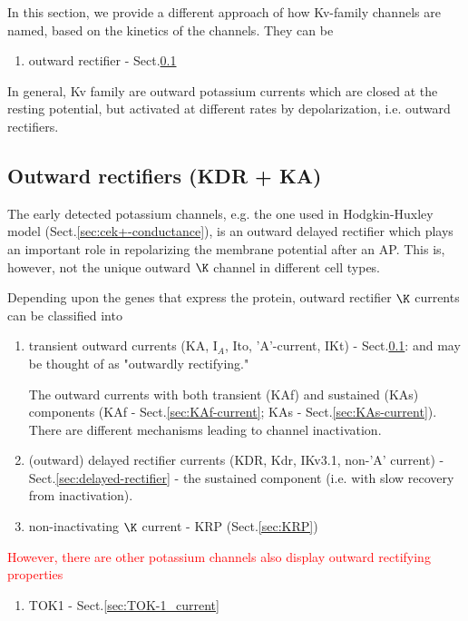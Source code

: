 In this section, we provide a different approach of how Kv-family channels are
named, based on the kinetics of the channels. 
They can be
\begin{enumerate}
  \item outward rectifier - Sect.\ref{sec:K_outward-rectifier}
\end{enumerate}
In general, Kv family are outward
potassium currents which are closed at the resting potential, but activated at
different rates by depolarization, i.e. outward rectifiers.

\subsection{Outward rectifiers (KDR + KA)}
\label{sec:K_outward-rectifier}

The early detected potassium channels, e.g. the one used in Hodgkin-Huxley
model (Sect.\ref{sec:cek+-conductance}), is an outward delayed rectifier which
plays an important role in repolarizing the membrane potential after an AP.
This is, however, not the unique outward $\K$ channel in different cell types. 

Depending upon the genes that express the protein, outward rectifier $\K$
currents can be classified into
\begin{enumerate}
  \item transient outward currents (KA, I$_A$, Ito, 'A'-current, IKt) -
  Sect.\ref{sec:K_outward-rectifier}: and may be thought of as "outwardly
  rectifying."

The outward currents with both transient (KAf) and sustained (KAs) components
(KAf - Sect.\ref{sec:KAf-current}; KAs - Sect.\ref{sec:KAs-current}).
There are different mechanisms leading to channel inactivation.
  
  \item (outward) delayed rectifier currents (KDR, Kdr, IKv3.1, non-'A' current)
  - Sect.\ref{sec:delayed-rectifier} - the sustained component (i.e. with slow
  recovery from inactivation).
  
  \item non-inactivating $\K$ current - KRP (Sect.\ref{sec:KRP})
\end{enumerate}

\textcolor{red}{However, there are other potassium channels also display outward
rectifying properties}
\begin{enumerate}
  \item TOK1 - Sect.\ref{sec:TOK-1_current}
\end{enumerate}

